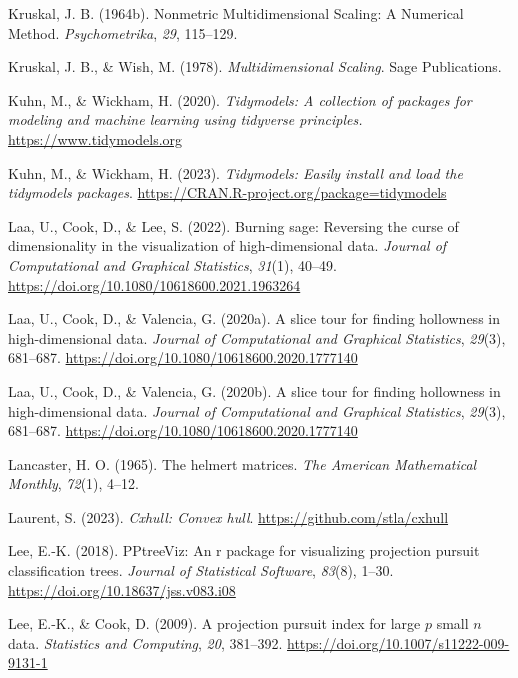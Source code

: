\documentclass[
  letterpaper,
]{krantz}
\newlength{\cslhangindent}
\newenvironment{CSLReferences}[2] %
 {\begin{list}{}{%
  \setlength{\itemindent}{0pt}
  \setlength{\leftmargin}{0pt}
  \setlength{\parsep}{0pt}
  \ifodd #1
   \setlength{\leftmargin}{\cslhangindent}
   \setlength{\itemindent}{-1\cslhangindent}
  \fi
  \setlength{\itemsep}{#2\baselineskip}}}
 {\end{list}}
\begin{document}
\begin{CSLReferences}{1}{0}
Kruskal, J. B. (1964b). Nonmetric {M}ultidimensional {S}caling: A
{N}umerical {M}ethod. \emph{Psychometrika}, \emph{29}, 115--129.

Kruskal, J. B., \& Wish, M. (1978). \emph{Multidimensional {S}caling}.
Sage Publications.

Kuhn, M., \& Wickham, H. (2020). \emph{Tidymodels: A collection of
packages for modeling and machine learning using tidyverse principles.}
\url{https://www.tidymodels.org}

Kuhn, M., \& Wickham, H. (2023). \emph{Tidymodels: Easily install and
load the tidymodels packages}.
\url{https://CRAN.R-project.org/package=tidymodels}

Laa, U., Cook, D., \& Lee, S. (2022). Burning sage: Reversing the curse
of dimensionality in the visualization of high-dimensional data.
\emph{Journal of Computational and Graphical Statistics}, \emph{31}(1),
40--49. \url{https://doi.org/10.1080/10618600.2021.1963264}

Laa, U., Cook, D., \& Valencia, G. (2020a). A slice tour for finding
hollowness in high-dimensional data. \emph{Journal of Computational and
Graphical Statistics}, \emph{29}(3), 681--687.
\url{https://doi.org/10.1080/10618600.2020.1777140}

Laa, U., Cook, D., \& Valencia, G. (2020b). A slice tour for finding
hollowness in high-dimensional data. \emph{Journal of Computational and
Graphical Statistics}, \emph{29}(3), 681--687.
\url{https://doi.org/10.1080/10618600.2020.1777140}

Lancaster, H. O. (1965). The helmert matrices. \emph{The American
Mathematical Monthly}, \emph{72}(1), 4--12.

Laurent, S. (2023). \emph{Cxhull: Convex hull}.
\url{https://github.com/stla/cxhull}

Lee, E.-K. (2018). PPtreeViz: An r package for visualizing projection
pursuit classification trees. \emph{Journal of Statistical Software},
\emph{83}(8), 1--30. \url{https://doi.org/10.18637/jss.v083.i08}

Lee, E.-K., \& Cook, D. (2009). A projection pursuit index for large
\(p\) small \(n\) data. \emph{Statistics and Computing}, \emph{20},
381--392. \url{https://doi.org/10.1007/s11222-009-9131-1}


\end{CSLReferences}
\end{document}
